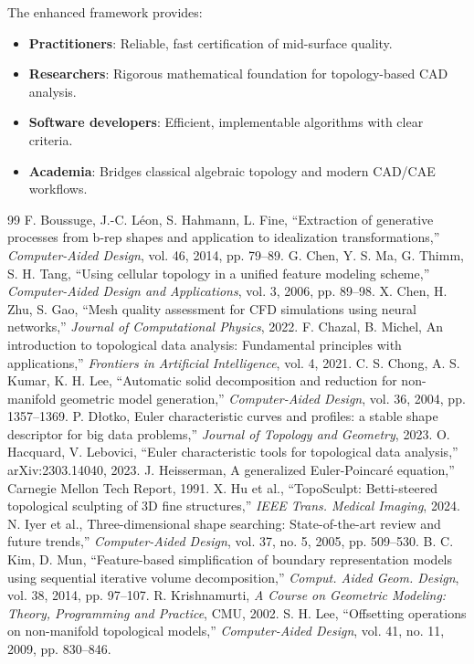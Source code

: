 \documentclass[conference]{IEEEtran}
\begin{document}
The enhanced framework provides:
\begin{itemize}
\item \textbf{Practitioners}: Reliable, fast certification of mid-surface quality.
\item \textbf{Researchers}: Rigorous mathematical foundation for topology-based CAD analysis.
\item \textbf{Software developers}: Efficient, implementable algorithms with clear criteria.
\item \textbf{Academia}: Bridges classical algebraic topology and modern CAD/CAE workflows.
\end{itemize} \begin{thebibliography}{99}
 F. Boussuge, J.-C. Léon, S. Hahmann, L. Fine, ``Extraction of generative processes from b-rep shapes and application to idealization transformations,'' \textit{Computer-Aided Design}, vol. 46, 2014, pp. 79–89.  G. Chen, Y. S. Ma, G. Thimm, S. H. Tang, ``Using cellular topology in a unified feature modeling scheme,'' \textit{Computer-Aided Design and Applications}, vol. 3, 2006, pp. 89–98.
 X. Chen, H. Zhu, S. Gao, ``Mesh quality assessment for CFD simulations using neural networks,'' \textit{Journal of Computational Physics}, 2022.  F. Chazal, B. Michel, An introduction to topological data analysis: Fundamental principles with applications,'' \textit{Frontiers in Artificial Intelligence}, vol. 4, 2021.
 C. S. Chong, A. S. Kumar, K. H. Lee, ``Automatic solid decomposition and reduction for non-manifold geometric model generation,'' \textit{Computer-Aided Design}, vol. 36, 2004, pp. 1357–1369.  P. Dłotko, Euler characteristic curves and profiles: a stable shape descriptor for big data problems,'' \textit{Journal of Topology and Geometry}, 2023.
 O. Hacquard, V. Lebovici, ``Euler characteristic tools for topological data analysis,'' arXiv:2303.14040, 2023.  J. Heisserman, A generalized Euler-Poincaré equation,'' Carnegie Mellon Tech Report, 1991.
 X. Hu et al., ``TopoSculpt: Betti-steered topological sculpting of 3D fine structures,'' \textit{IEEE Trans. Medical Imaging}, 2024.  N. Iyer et al., Three-dimensional shape searching: State-of-the-art review and future trends,'' \textit{Computer-Aided Design}, vol. 37, no. 5, 2005, pp. 509–530.
 B. C. Kim, D. Mun, ``Feature-based simplification of boundary representation models using sequential iterative volume decomposition,'' \textit{Comput. Aided Geom. Design}, vol. 38, 2014, pp. 97–107.  R. Krishnamurti, \textit{A Course on Geometric Modeling: Theory, Programming and Practice}, CMU, 2002.  S. H. Lee, ``Offsetting operations on non-manifold topological models,'' \textit{Computer-Aided Design}, vol. 41, no. 11, 2009, pp. 830–846.

\end{thebibliography}
\end{document}
